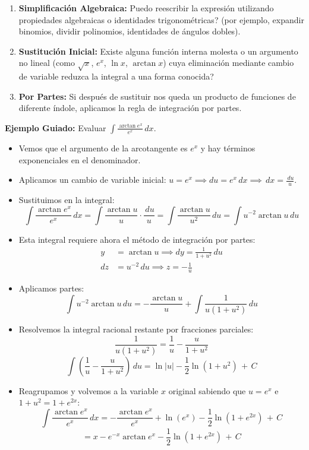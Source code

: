 \documentclass[12pt, letterpaper]{article}
\newcommand{\dx}{\,dx}
\newcommand{\du}{\,du}
\newcommand{\CC}{\,+\,C}
\begin{document}
\begin{cuadroextra}
\begin{enumerate}[leftmargin=*, label=\arabic*.]
  \item \textbf{Simplificación Algebraica:} \textquestiondown Puedo reescribir la expresión utilizando propiedades algebraicas o identidades trigonométricas? (por ejemplo, expandir binomios, dividir polinomios, identidades de ángulos dobles).
  \item \textbf{Sustitución Inicial:} \textquestiondown Existe alguna función interna molesta o un argumento no lineal (como $\sqrt{x}$, $e^x$, $\ln x$, $\arctan x$) cuya eliminación mediante cambio de variable reduzca la integral a una forma conocida?
  \item \textbf{Por Partes:} Si después de sustituir nos queda un producto de funciones de diferente índole, aplicamos la regla de integración por partes.
\end{enumerate}
\end{cuadroextra}

\noindent\textbf{Ejemplo Guiado:} Evaluar $\int \frac{\arctan e^x}{e^x} \dx$.
\begin{itemize}
  \item Vemos que el argumento de la arcotangente es $e^x$ y hay términos exponenciales en el denominador.
  \item Aplicamos un cambio de variable inicial: $u = e^x \implies du = e^x \dx \implies \dx = \frac{\du}{u}$.
  \item Sustituimos en la integral:
    $$\int \frac{\arctan e^x}{e^x} \dx = \int \frac{\arctan u}{u} \cdot \frac{\du}{u} = \int \frac{\arctan u}{u^2} \du = \int u^{-2} \arctan u \du$$
  \item Esta integral requiere ahora el método de integración por partes:
    \begin{align*}
      y &= \arctan u \implies dy = \frac{1}{1+u^2} \du \\
      dz &= u^{-2} \du \implies z = -\frac{1}{u}
    \end{align*}
  \item Aplicamos partes:
    $$\int u^{-2} \arctan u \du = -\frac{\arctan u}{u} + \int \frac{1}{u(1+u^2)} \du$$
  \item Resolvemos la integral racional restante por fracciones parciales:
    $$\frac{1}{u(1+u^2)} = \frac{1}{u} - \frac{u}{1+u^2}$$
    $$\int \left(\frac{1}{u} - \frac{u}{1+u^2}\right) \du = \ln|u| - \frac{1}{2}\ln(1+u^2) \CC$$
  \item Reagrupamos y volvemos a la variable $x$ original sabiendo que $u = e^x$ e $1+u^2 = 1+e^{2x}$:
    $$\int \frac{\arctan e^x}{e^x} \dx = -\frac{\arctan e^x}{e^x} + \ln(e^x) - \frac{1}{2}\ln(1+e^{2x}) \CC$$
    $$= x - e^{-x}\arctan e^x - \frac{1}{2}\ln(1+e^{2x}) \CC$$
\end{itemize}
\end{document}

